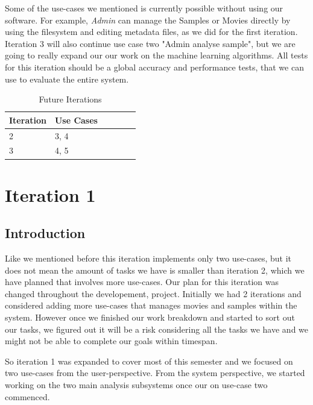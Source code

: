 \documentclass[12pt,a4paper,man]{report}
\begin{document}
Some of the use-cases we mentioned is currently possible without using our software. For example, \emph{Admin} can manage the Samples 
or Movies directly by using the filesystem and editing metadata files, as we did for the first iteration. Iteration 3 will also continue use case two "Admin analyse sample", but we are going to really expand our our work on the machine learning algorithms. All tests for this iteration should be a global accuracy and performance tests, that we can use to evaluate the entire system.



\begin{table}[htbp]
\caption{\label{table:fuiterplan}
Future Iterations}
\centering
\begin{tabular}{|l|l|l|l|lp{3cm}|}
\hline
\textbf{Iteration} & \textbf{Use Cases} \footnotemark\\
\hline
2 & 3, 4\\
3 & 4, 5\\
\hline
\end{tabular}
\end{table}


\chapter{Iteration 1}
\label{sec:org01f4d2c}
\section{Introduction}
\label{sec:org7bea8e2}
Like we mentioned before this iteration implements only two use-cases, but it does not mean the amount of tasks we have is smaller than iteration 2, which we have planned that involves more use-cases. Our plan for this iteration was changed throughout the developement, project. Initially we had 2 iterations and considered adding more use-cases that manages movies and samples within the system. However once we finished our work breakdown and started to sort out our tasks, we figured out it will be a risk considering all the tasks we have and we might not be able to complete our goals within timespan. 

So iteration 1 was expanded to cover most of this semester and we focused on two use-cases from the user-perspective. From the system perspective, we started working on the two main analysis subsystems once our on use-case two commenced. 
\end{document}
